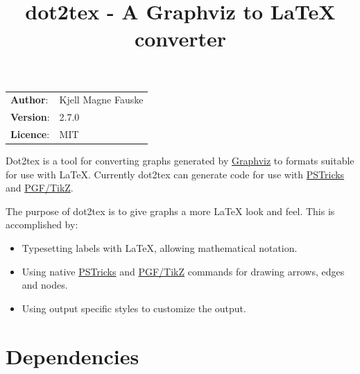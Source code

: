 \documentclass[10pt,a4paper,english]{article}
\title{dot2tex - A Graphviz to LaTeX converter}
\author{}
\date{}
\newlength{\docinfowidth}
\newlength{\locallinewidth}
\begin{document}
\maketitle
\begin{center}
\begin{tabularx}{\docinfowidth}{lX}
\textbf{Author}: &
	Kjell Magne Fauske \\
\textbf{Version}: &
	2.7.0 \\
\textbf{Licence}: &
	MIT \\
\end{tabularx}
\end{center}

\setlength{\locallinewidth}{\linewidth}


Dot2tex is a tool for converting graphs generated by \href{http://www.graphviz.org/}{Graphviz} to formats suitable for use with LaTeX. Currently dot2tex can generate code for use with \href{http://tug.org/PSTricks/main.cgi/}{PSTricks} and \href{http://www.ctan.org/tex-archive/help/Catalogue/entries/pgf.html}{PGF/TikZ}.

The purpose of dot2tex is to give graphs a more LaTeX look and feel. This is accomplished by:
\begin{itemize}
\item {} 
Typesetting labels with LaTeX, allowing mathematical notation.

\item {} 
Using native \href{http://tug.org/PSTricks/main.cgi/}{PSTricks} and \href{http://www.ctan.org/tex-archive/help/Catalogue/entries/pgf.html}{PGF/TikZ} commands for drawing arrows, edges
and nodes.

\item {} 
Using output specific styles to customize the output.

\end{itemize}



\hypertarget{dependencies}{}
\section*{Dependencies}
\label{dependencies}
\end{document}
